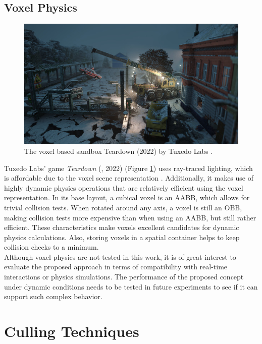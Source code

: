 \subsection*{Voxel Physics} \label{subsec-voxel-physics}

\begin{figure}[h]
    \centering
    \includegraphics[width=\linewidth]{images/graphics/teardown.jpg}
    \caption{The voxel based sandbox Teardown (2022) by Tuxedo Labs \cite{TuxedoLabs2022}.}
    \label{fig:teardown}
\end{figure}

\noindent
Tuxedo Labs' game \emph{Teardown} (\cite{TeardownSteam2022}, 2022) (Figure \ref{fig:teardown}) uses ray-traced 
lighting, which is affordable due to the voxel scene representation \cite{TuxedoLabs2022}. Additionally, 
it makes use of highly dynamic physics operations that are relatively efficient using the voxel representation. 
In its base layout, a cubical voxel is an \ac{AABB}, which allows for trivial collision tests. When rotated 
around any axis, a voxel is still an \ac{OBB}, making collision tests more expensive than when using an \ac{AABB}, 
but still rather efficient. These characteristics make voxels excellent candidates for dynamic physics 
calculations. Also, storing voxels in a spatial container helps to keep collision checks to a minimum. \\

\noindent
Although voxel physics are not tested in this work, it is of great interest to evaluate the proposed approach 
in terms of compatibility with real-time interactions or physics simulations. The performance of the proposed 
concept under dynamic conditions needs to be tested in future experiments to see if it can support such complex 
behavior.

\section{Culling Techniques} \label{sec-culling-techniques}

